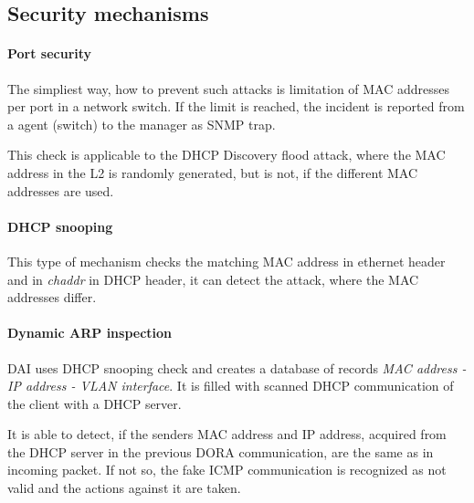 \documentclass[10pt,a4paper,titlepage]{article}
\begin{document}
\subsection*{Security mechanisms}

\paragraph{Port security}
The simpliest way, how to prevent such attacks is limitation of MAC addresses
per port in a network switch. If the limit is reached, the incident is reported
from a agent (switch) to the manager as SNMP trap.

This check is applicable to the DHCP Discovery flood attack, where the MAC address
in the L2 is randomly generated, but is not, if the different MAC addresses are used.

\paragraph{DHCP snooping}
This type of mechanism checks the matching MAC address in ethernet header
and in {\it chaddr} in DHCP header, it can detect the attack, where the MAC
addresses differ.

\paragraph{Dynamic ARP inspection}
DAI uses DHCP snooping check and creates a database of records {\it MAC address
- IP address - VLAN interface}. It is filled with scanned DHCP communication
of the client with a DHCP server.

It is able to detect, if the senders MAC address and IP address, acquired from
the DHCP server in the previous DORA communication, are the same as in
incoming packet. If not so, the fake ICMP communication is recognized as not
valid and the actions against it are taken.



\newpage
\printbibliography
\end{document}
